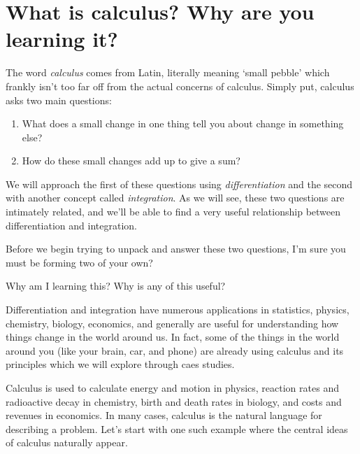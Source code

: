 \section{What is calculus? Why are you learning it?}

The word \emph{calculus} comes from Latin, literally meaning `small pebble' which frankly isn't too far off from the actual concerns of calculus. Simply put, calculus asks two main questions:

\begin{quest}\label{mainquestion}\leavevmode
	\begin{enumerate}
		\item What does a small change in one thing tell you about change in something else?
		\vspace{2mm}
		\item How do these small changes add up to give a sum?
	\end{enumerate}
\end{quest}

We will approach the first of these questions using \emph{differentiation} and the second with another concept called \emph{integration}. As we will see, these two questions are intimately related, and we'll be able to find a very useful relationship between differentiation and integration.

Before we begin trying to unpack and answer these two questions, I'm sure you must be forming two of your own?
\begin{quest}
Why am I learning this?	Why is any of this useful?
\end{quest}

Differentiation and integration have numerous applications in statistics, physics, chemistry, biology, economics, and generally are useful for understanding how things change in the world around us. In fact, some of the things in the world around you (like your brain, car, and phone) are already using calculus and its principles which we will explore through caes studies.

Calculus is used to calculate energy and motion in physics, reaction rates and radioactive decay in chemistry, birth and death rates in biology, and costs and revenues in economics. In many cases, calculus is the natural language for describing a problem. Let's start with one such example where the central ideas of calculus naturally appear.

